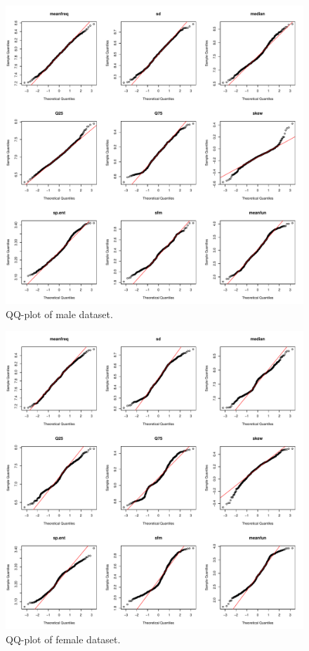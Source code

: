 \documentclass{article}
\begin{document}
	\begin{figure}
		\centering
		\includegraphics[width=\textwidth]{graphs/gender/qq_plot_male.pdf}
		\caption{QQ-plot of male dataset.}
		\label{qq_male}
	\end{figure}
	\begin{figure}
		\centering
		\includegraphics[width=\textwidth]{graphs/gender/qq_plot_female.pdf}
		\caption{QQ-plot of female dataset.}
		\label{qq_female}
	\end{figure}
	
\end{document}
